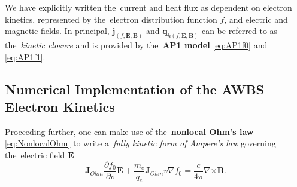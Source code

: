 \documentclass[
 aps,
 jmp,
 amsmath,amssymb,
 twocolumn,
]{revtex4-1}
\newcommand{\pdv}[2]{\frac{\partial{#1}}{\partial{#2}}}
\newcommand{\vect}[1]{\boldsymbol{#1}}
\newcommand{\matr}[1]{\mathbf{#1}}
\newcommand{\vmag}{v}
\newcommand{\E}{\vect{E}}
\newcommand{\B}{\vect{B}}
\newcommand{\qe}{q_e}
\newcommand{\me}{m_e}
\newcommand{\fzero}{f_0}
\newcommand{\Iohm}{\matr{J}_{Ohm}}
\begin{document}
We have explicitly written the~current and heat flux as dependent on
electron kinetics, represented by the~electron distribution function $f$,
and electric and magnetic fields. In principal, $\vect{j}_{(f, \E, \B)}$
and $\vect{q}_{h(f, \E, \B)}$ can be referred to as the~\textit{kinetic closure}
and is provided by the~{\bf AP1 model} \eqref{eq:AP1f0} and \eqref{eq:AP1f1}.

\subsection{Numerical Implementation of the AWBS Electron Kinetics}
\label{sec:Numerics}

Proceeding further, one can make use of 
the~{\bf nonlocal Ohm's law} \eqref{eq:NonlocalOhm} to write 
a~\textit{fully kinetic form of Ampere's law} 
governing the~electric field $\E$
\begin{equation}
  \Iohm\pdv{\fzero}{\vmag}\E 
  + \frac{\me}{\qe} \Iohm\vmag \nabla \fzero = 
  \frac{c}{4\pi} \nabla\vect{\times}\B 
  .
  \label{eq:AmpereKinetic}
\end{equation}
\end{document}
